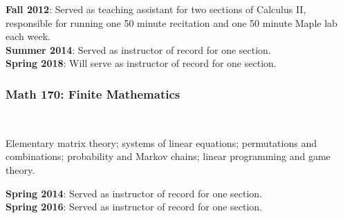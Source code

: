 \documentclass[teaching.portfolio.tex]{subfiles}
\begin{document}
\noindent
\textbf{Fall 2012}: Served as teaching assistant for two sections of Calculus II, responsible for running one 50 minute recitation and one 50 minute Maple lab each week.\\
\textbf{Summer 2014}: Served as instructor of record for one section.\\
\textbf{Spring 2018}: Will serve as instructor of record for one section.

\subsubsection{Math 170: Finite Mathematics}\hfill\\
\begin{tcolorbox}
  \begin{desc}
    Elementary matrix theory; systems of linear equations; permutations and combinations; probability and Markov chains; linear programming and game theory.
  \end{desc}
\end{tcolorbox}

\noindent
\textbf{Spring 2014}: Served as instructor of record for one section.\\
\textbf{Spring 2016}: Served as instructor of record for one section.
\end{document}
